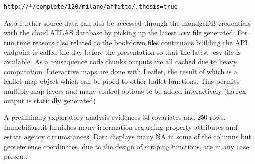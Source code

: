 \documentclass[
  12pt,
  a4paper,
  oneside]{book}
\theoremstyle{definition}
\theoremstyle{definition}
\theoremstyle{definition}
\theoremstyle{remark}
\begin{document}
\texttt{http://*/complete/120/milano/affitto/.thesis=true}

As a further source data can also be accessed through the mondgoDB credentials with the cloud ATLAS database by picking up the latest .csv file generated. For run time reasons also related to the bookdown files continuous building the API endpoint is called the day before the presentation so that the latest .csv file is available. As a consequence code chunks outputs are all cached due to heavy computation.
Interactive maps are done with Leaflet, the result of which is a leaflet map object which can be piped to other leaflet functions. This permits multiple map layers and many control options to be added interactively (LaTex output is statically generated)

A preliminary exploratory analysis evidences 34 covariates and 250 rows. Immobiliare.it furnishes many information regarding property attributes and estate agency circumstances. Data displays many NA in some of the columns but georeference coordinates, due to the design of scraping functions, are in any case present.
\end{document}
